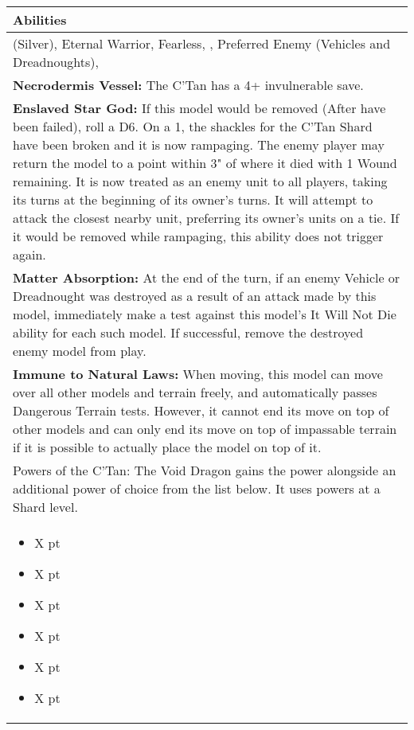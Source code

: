 \noindent
\begin{tabular}{||m{532pt}||}
	\hline
	Abilities \\
	\hline
	\quickref{Awakening Protocols} (Silver), Eternal Warrior, Fearless, \quickref{Living Metal}, Preferred Enemy (Vehicles and Dreadnoughts), \quickref{Reanimation Protocols} \\
	\textbf{Necrodermis Vessel:} The C'Tan has a 4+ invulnerable save. \\
	\textbf{Enslaved Star God:} If this model would be removed (After \quickref{Reanimation Protocols} have been failed), roll a D6. On a 1, the shackles for the C'Tan Shard have been broken and it is now rampaging. The enemy player may return the model to a point within 3" of where it died with 1 Wound remaining. It is now treated as an enemy unit to all players, taking its turns at the beginning of its owner's turns. It will attempt to attack the closest nearby unit, preferring its owner's units on a tie. If it would be removed while rampaging, this ability does not trigger again. \\
	\textbf{Matter Absorption:} At the end of the turn, if an enemy Vehicle or Dreadnought was destroyed as a result of an attack made by this model, immediately make a test against this model's It Will Not Die ability for each such model. If successful, remove the destroyed enemy model from play. \\
	\textbf{Immune to Natural Laws:} When moving, this model can move over all other models and terrain 	freely, and automatically passes Dangerous Terrain tests. However, it 	cannot end its move on top of other models and can only end its move on top of impassable terrain if it is possible to actually place the model on top of it. \\
	Powers of the C'Tan: The Void Dragon gains the \quickref{Voltaic Storm} power alongside an additional power of choice from the list below. It uses powers at a Shard level. \\
	\begin{itemize}
		\item \quickref{Antimatter Meteor} \hrulefill X pt
		\item \quickref{Cosmic Fire} \hrulefill X pt
		\item \quickref{Entropic Touch} \hrulefill X pt
		\item \quickref{Moulder of Worlds} \hrulefill X pt
		\item \quickref{Pyreshards} \hrulefill X pt
		\item \quickref{Sentient Singularity} \hrulefill X pt

\end{itemize}
\end{tabular}
